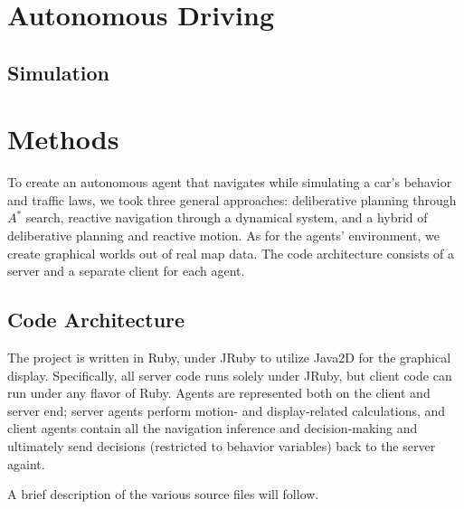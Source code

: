 \documentclass{article}
\begin{document}
\section{Autonomous Driving}

\subsection{Simulation}

\section{Methods}

To create an autonomous agent that navigates while simulating a car's behavior
and traffic laws, we took three general approaches: deliberative planning
through $A^*$ search, reactive navigation through a dynamical system, and a hybrid
of deliberative planning and reactive motion. As for the agents' environment, we
create graphical worlds out of real map data. The code architecture consists of
a server and a separate client for each agent.

\subsection{Code Architecture}

The project is written in Ruby, under JRuby to utilize Java2D for the graphical
display. Specifically, all server code runs solely under JRuby, but client
code can run under any flavor of Ruby. Agents are represented both on the client
and server end; server agents perform motion- and display-related
calculations, and client agents contain all the navigation inference and
decision-making and ultimately send decisions (restricted to behavior variables)
back to the server againt.

A brief description of the various source files will follow.
\end{document}
